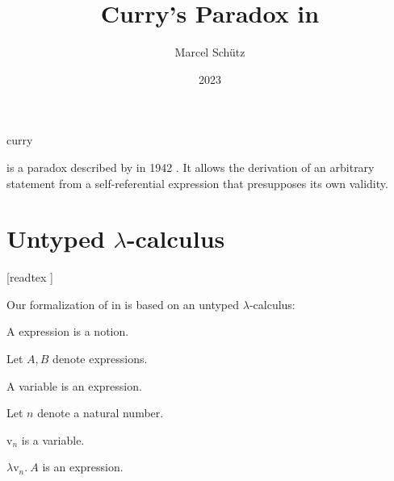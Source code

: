 \documentclass{stex}
\newcommand{\var}[1]{\mathrm{v}_{#1}}
\newcommand{\abs}[2]{\lambda\var{#1}.\ #2}
\begin{document}
\title{Curry's Paradox in \Naproche}
\author{Marcel Schütz}
\date{2023}
\maketitle
\begin{smodule}{curry}
\begin{sparagraph}
  \noindent \emph{} is a paradox described by  in 1942 \cite{Curry1942}.
  It allows the derivation of an arbitrary statement from a self-referential expression that presupposes its own validity.
\end{sparagraph}

\section*{Untyped $\lambda$-calculus}

\begin{forthel}

  [readtex ]

\end{forthel}

\begin{sparagraph}
  \noindent Our formalization of  in \Naproche is based on an untyped $\lambda$-calculus:
\end{sparagraph}

\begin{forthel}
  \begin{signature*}
    A expression is a notion.
  \end{signature*}

  Let $A, B$ denote expressions.

  \begin{signature*}
    A variable is an expression.
  \end{signature*}

  Let $n$ denote a natural number.

  \begin{signature*}
    $\var{n}$ is a variable.
  \end{signature*}

  \begin{signature*}[Abstraction]\label{abstraction}
    $\abs{n}{A}$ is an expression.
  \end{signature*}


\end{forthel}
\end{smodule}
\end{document}
